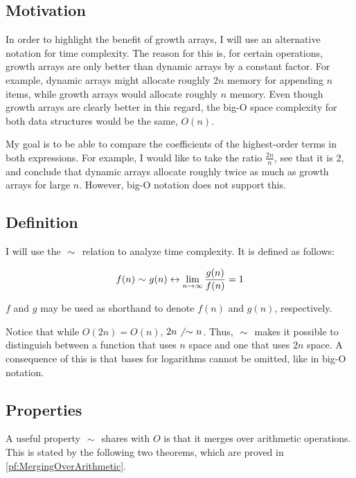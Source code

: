 \subsection{Motivation}

In order to highlight the benefit of growth arrays, I will use an alternative notation for time complexity. The reason for this is, for certain operations, growth arrays are only better than dynamic arrays by a constant factor. For example, dynamic arrays might allocate roughly $2n$ memory for appending $n$ items, while growth arrays would allocate roughly $n$ memory. Even though growth arrays are clearly better in this regard, the big-O space complexity for both data structures would be the same, $O(n)$.

My goal is to be able to compare the coefficients of the highest-order terms in both expressions. For example, I would like to take the ratio $\frac{2n}{n}$, see that it is $2$, and conclude that dynamic arrays allocate roughly twice as much as growth arrays for large $n$. However, big-O notation does not support this.

\subsection{Definition}

I will use the $\ \mathtt{\sim}\ $ relation to analyze time complexity. It is defined as follows:

\begin{align*}
f(n) \ \mathtt{\sim}\  g(n) \leftrightarrow \lim_{n \to \infty} \frac{g(n)}{f(n)} = 1
\end{align*}

$f$ and $g$ may be used as shorthand to denote $f(n)$ and $g(n)$, respectively.

Notice that while $O(2n) = O(n)$, $2n \not\ \mathtt{\sim}\  n$. Thus, $\ \mathtt{\sim}\ $ makes it possible to distinguish between a function that uses $n$ space and one that uses $2n$ space. \HdrNote A consequence of this is that bases for logarithms cannot be omitted, like in big-O notation.

\subsection{Properties}
\label{subsec:AsymptoticProperties}

A useful property $\ \mathtt{\sim}\ $ shares with $O$ is that it merges over arithmetic operations. This is stated by the following two theorems, which are proved in \ref{pf:MergingOverArithmetic}.

